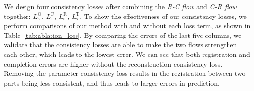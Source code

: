 



We design four consistency losses after combining the \textit{R-C flow} and \textit{C-R flow} together: $L_{\text{s}}^{\text{O}}$, $L_{\text{s}}^{\text{C}}$, $L_{\text{s}}^{\text{R}}$, $L_{\text{s}}^{\text{T}}$.
To show the effectiveness of our consistency losses, we perform comparisons of our method with and without each loss term, as shown in Table~\ref{tab:ablation_loss}. By comparing the errors of the last five columns, we validate that the consistency losses are able to make the two flows strengthen each other, which leads to the lowest error.
We can see that both registration and completion errors are higher without the reconstruction consistency loss. Removing the parameter consistency loss results in the registration between two parts being less consistent, and thus leads to larger errors in prediction.



